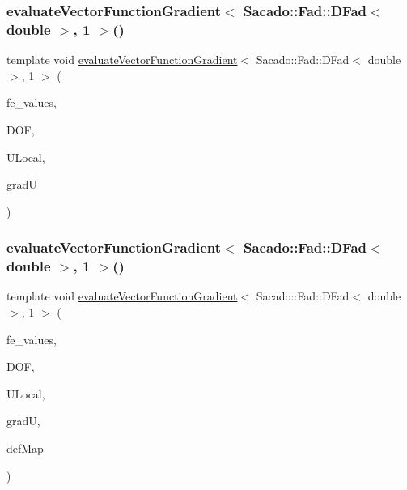 \subsubsection{\texorpdfstring{evaluate\+Vector\+Function\+Gradient$<$ Sacado\+::\+Fad\+::\+D\+Fad$<$ double $>$, 1 $>$()}{evaluateVectorFunctionGradient< Sacado::Fad::DFad< double >, 1 >()}\hspace{0.1cm}{\footnotesize\ttfamily [1/4]}}
{\footnotesize\ttfamily template void \mbox{\hyperlink{group___evaluation_functions_ga9608539d601a91aff1ba01ccc720fbe0}{evaluate\+Vector\+Function\+Gradient}}$<$ Sacado\+::\+Fad\+::\+D\+Fad$<$ double $>$, 1 $>$ (\begin{DoxyParamCaption}\item[{const F\+E\+Values$<$ 1 $>$ \&}]{fe\+\_\+values,  }\item[{unsigned int}]{D\+OF,  }\item[{Table$<$ 1, Sacado\+::\+Fad\+::\+D\+Fad$<$ double $>$$>$ \&}]{U\+Local,  }\item[{Table$<$ 3, Sacado\+::\+Fad\+::\+D\+Fad$<$ double $>$$>$ \&}]{gradU }\end{DoxyParamCaption})}

\mbox{\label{function_evaluations_8cc_a1fb7d1f43d659f0916ca96a9c951931c}} 
\subsubsection{\texorpdfstring{evaluate\+Vector\+Function\+Gradient$<$ Sacado\+::\+Fad\+::\+D\+Fad$<$ double $>$, 1 $>$()}{evaluateVectorFunctionGradient< Sacado::Fad::DFad< double >, 1 >()}\hspace{0.1cm}{\footnotesize\ttfamily [2/4]}}
{\footnotesize\ttfamily template void \mbox{\hyperlink{group___evaluation_functions_ga9608539d601a91aff1ba01ccc720fbe0}{evaluate\+Vector\+Function\+Gradient}}$<$ Sacado\+::\+Fad\+::\+D\+Fad$<$ double $>$, 1 $>$ (\begin{DoxyParamCaption}\item[{const F\+E\+Values$<$ 1 $>$ \&}]{fe\+\_\+values,  }\item[{unsigned int}]{D\+OF,  }\item[{Table$<$ 1, Sacado\+::\+Fad\+::\+D\+Fad$<$ double $>$$>$ \&}]{U\+Local,  }\item[{Table$<$ 3, Sacado\+::\+Fad\+::\+D\+Fad$<$ double $>$$>$ \&}]{gradU,  }\item[{\mbox{\hyperlink{structdeformation_map}{deformation\+Map}}$<$ Sacado\+::\+Fad\+::\+D\+Fad$<$ double $>$, 1 $>$ \&}]{def\+Map }\end{DoxyParamCaption})}

